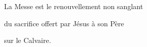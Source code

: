 La Messe est le renouvellement non sanglant\par du sacrifice offert par Jésus à son Père\par sur le Calvaire.
